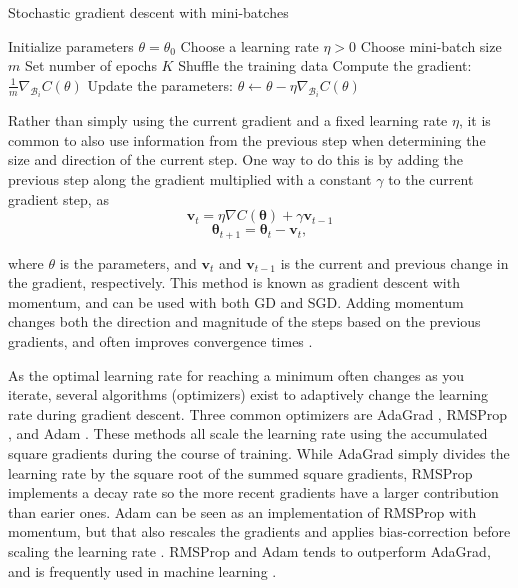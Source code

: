 \begin{algorithm}
\caption{Stochastic gradient descent with mini-batches}\label{alg:sgd}
\begin{algorithmic}[1]
    \STATE Initialize parameters $\theta = \theta_0$
    \STATE Choose a learning rate $\eta > 0$
    \STATE Choose mini-batch size $m$
    \STATE Set number of epochs $K$
        \STATE Shuffle the training data
            \STATE Compute the gradient: $\frac{1}{m}\nabla_{\mathcal{B}_i} C(\theta)$
            \STATE Update the parameters: $\theta \leftarrow \theta - \eta \nabla_{\mathcal{B}_i} C(\theta)$
        \ENDFOR
    \ENDFOR
\end{algorithmic}
\end{algorithm}

Rather than simply using the current gradient and a fixed learning rate $\eta$, it is common to also use information from the previous step when determining the size and direction of the current step. One way to do this is by adding the previous step along the gradient multiplied with a constant $\gamma$ to the current gradient step, as
\begin{equation}
    \mathbf{v}_{t} = \eta \nabla C(\boldsymbol{\theta}) + \gamma \mathbf{v}_{t-1}
\end{equation}
\begin{equation}
    \boldsymbol{\theta}_{t+1}= \boldsymbol{\theta}_t -\mathbf{v}_{t},
\end{equation}
    
where $\theta$ is the parameters, and $\mathbf{v}_t$ and $\mathbf{v}_{t-1}$ is the current and previous change in the gradient, respectively. This method is known as gradient descent with momentum, and can be used with both GD and SGD. Adding momentum changes both the direction and magnitude of the steps based on the previous gradients, and often improves convergence times \cite{Goodfellow:2016:deep_learning}.

As the optimal learning rate for reaching a minimum often changes as you iterate, several algorithms (optimizers) exist to adaptively change the learning rate during gradient descent. Three common optimizers are AdaGrad \cite{duchi2011:adagrad}, RMSProp \cite{hinton2012:rmsprop}, and Adam \cite{kingma2017:Adam}. These methods all scale the learning rate using the accumulated square gradients during the course of training. While AdaGrad simply divides the learning rate by the square root of the summed square gradients, RMSProp implements a decay rate so the more recent gradients have a larger contribution than earier ones. Adam can be seen as an implementation of RMSProp with momentum, but that also rescales the gradients and applies bias-correction before scaling the learning rate \cite{Goodfellow:2016:deep_learning}. RMSProp and Adam tends to outperform AdaGrad, and is frequently used in machine learning \cite{Goodfellow:2016:deep_learning}.




